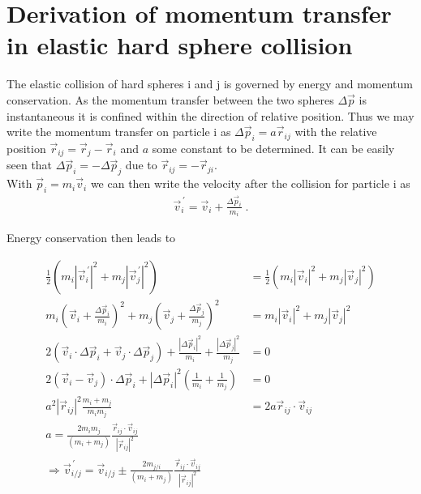 
\appendix
\label{sec:appendix}
\section{Derivation of momentum transfer in elastic hard sphere collision}
The elastic collision of hard spheres i and j is governed by energy and momentum conservation. As the momentum transfer between the two spheres $\Delta \vec{p}$ is instantaneous it is confined within the direction of relative position. Thus we may write the momentum transfer on particle i as $\Delta \vec{p}_i = a \vec{r}_{ij}$ with the relative position $\vec{r}_{ij} = \vec{r}_{j} -\vec{r}_{i} $ and $a$ some constant to be determined. It can be easily seen that $\Delta \vec{p}_i = - \Delta \vec{p}_j$ due to $\vec{r}_{ij} = -\vec{r}_{ji}$. \\

With $\vec{p}_i = m_i \vec{v}_i$ we can then write the velocity after the collision for particle i as
\begin{align}
\vec{v}_i^{\,'} = \vec{v}_i +\frac{\Delta \vec{p}_i } {m_i} \; \text{.}
\end{align}

Energy conservation then leads to

\begin{align}
\label{eqn:momentum_transfer}
\frac{1}{2}\left( m_i |\vec{v}_i^{\,'}|^2 + m_j |\vec{v}_j^{\,'}|^2 \right) &= \frac{1}{2}\left( m_i |\vec{v}_i|^2 + m_j |\vec{v}_j|^2 \right)\\
 m_i \left(  \vec{v}_i +\frac{\Delta \vec{p}_i } {m_i} \right)^2 + m_ j\left(  \vec{v}_j +\frac{\Delta \vec{p}_j } {m_j} \right)^2  &= m_i |\vec{v}_i|^2 + m_j |\vec{v}_j|^2 \\
2 \left(  \vec{v}_i \cdot  \Delta \vec{p}_i  +\vec{v}_j \cdot  \Delta \vec{p}_j   \right)+\frac{|\Delta \vec{p}_i|^2 } {m_i} +\frac{|\Delta \vec{p}_j|^2 } {m_j} &= 0\\
2 (\vec{v}_i - \vec{v}_j)\cdot \Delta \vec{p}_i + |\Delta \vec{p}_i|^2 \left(\frac{1}{m_i} +\frac{1}{m_j} \right) &=0\\
a^2 |\vec{r}_{ij}|^2 \frac{m_i + m_j}{m_i m_j} &= 2 a \vec{r}_{ij} \cdot \vec{v}_{ij} \\
a = \frac{2 m_i m_j }{(m_i + m_j)  } \frac{\vec{r}_{ij} \cdot \vec{v}_{ij}}{|\vec{r}_{ij}|^2}\\
\Rightarrow \vec{v}_{i/j}^{\,'} = \vec{v}_{i/j} \pm \frac{2 m_{j/i} }{(m_i + m_j)  } \frac{\vec{r}_{ij} \cdot \vec{v}_{ij}}{|\vec{r}_{ij}|^2}
\end{align}
